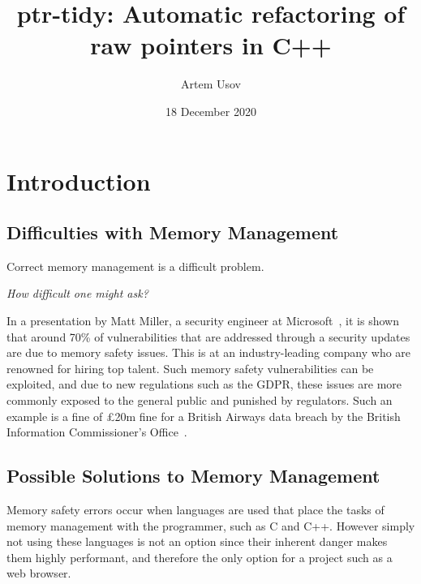 \documentclass{proposal}
\begin{document}




    \title{ptr-tidy: Automatic refactoring of raw pointers in C++}
    \author{Artem Usov}
    \date{18 December 2020}
    \maketitle
    \tableofcontents
    \newpage




    \section{Introduction}\label{sec:intro}

    \subsection{Difficulties with Memory Management}\label{subsec:difficulties-with-memory-management}


    Correct memory management is a difficult problem.

    \emph{How difficult one might ask?}

    In a presentation by Matt Miller, a security engineer at Microsoft~\cite{Miller2019}, it is shown that around 70\% of vulnerabilities that are addressed through a security updates are due to memory safety issues.
    This is at an industry-leading company who are renowned for hiring top talent.
    Such memory safety vulnerabilities can be exploited, and due to new regulations such as the GDPR, these issues are more commonly exposed to the general public and punished by regulators.
    Such an example is a fine of £20m fine for a British Airways data breach by the British Information Commissioner's Office~\cite{ICO2020}.

    \subsection{Possible Solutions to Memory Management}\label{subsec:possible-solutions-to-memory-management}

    Memory safety errors occur when languages are used that place the tasks of memory management with the programmer, such as C and C++.
    However simply not using these languages is not an option since their inherent danger makes them highly performant, and therefore the only option for a project such as a web browser.
\end{document}
